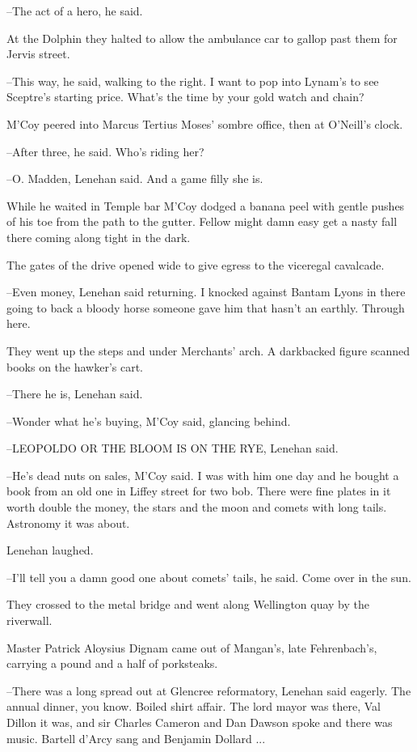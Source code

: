 --The act of a hero,
he said.

At the Dolphin
they halted to allow the ambulance car to gallop past
them for Jervis street.

--This way,
he said,
walking to the right.
I want to pop into Lynam's to
see Sceptre's starting price.
What's the time by your gold watch and
chain?

M'Coy peered into Marcus Tertius Moses' sombre office,
then at
O'Neill's clock.

--After three,
he said.
Who's riding her?

--O. Madden,
Lenehan said.
And a game filly she is.

While he waited in Temple bar
M'Coy dodged a banana peel with
gentle pushes of his toe
from the path to the gutter.
Fellow might damn
easy get a nasty fall there
coming along tight in the dark.

The gates of the drive opened wide
to give egress to the viceregal
cavalcade.

--Even money,
Lenehan said returning.
I knocked against Bantam Lyons in
there
going to back a bloody horse someone gave him that hasn't an
earthly.
Through here.

They went up the steps and under Merchants' arch.
A darkbacked figure scanned books on the hawker's cart.

--There he is,
Lenehan said.

--Wonder what he's buying,
M'Coy said,
glancing behind.

--LEOPOLDO OR THE BLOOM IS ON THE RYE,
Lenehan said.

--He's dead nuts on sales,
M'Coy said.
I was with him one day
and he
bought a book from an old one in Liffey street for two bob.
There were
fine plates in it worth double the money,
the stars and the moon and
comets with long tails.
Astronomy it was about.

Lenehan laughed.

--I'll tell you a damn good one about comets' tails,
he said.
Come over in the sun.

They crossed to the metal bridge
and went along Wellington quay by
the riverwall.

Master Patrick Aloysius Dignam came out of Mangan's,
late
Fehrenbach's,
carrying a pound and a half of porksteaks.

--There was a long spread out at Glencree reformatory,
Lenehan said
eagerly.
The annual dinner, you know.
Boiled shirt affair.
The lord mayor
was there, Val Dillon it was,
and sir Charles Cameron and Dan Dawson
spoke
and there was music.
Bartell d'Arcy sang and Benjamin Dollard ...

